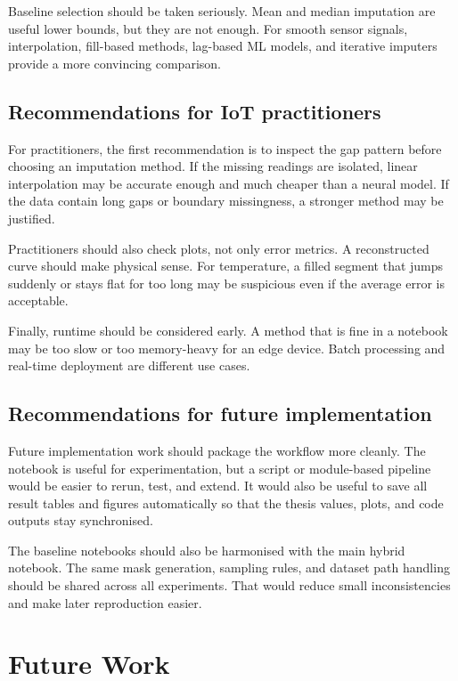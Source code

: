 Baseline selection should be taken seriously. Mean and median imputation are useful lower bounds, but they are not enough. For smooth sensor signals, interpolation, fill-based methods, lag-based ML models, and iterative imputers provide a more convincing comparison.

\subsection{Recommendations for IoT practitioners}

For practitioners, the first recommendation is to inspect the gap pattern before choosing an imputation method. If the missing readings are isolated, linear interpolation may be accurate enough and much cheaper than a neural model. If the data contain long gaps or boundary missingness, a stronger method may be justified.

Practitioners should also check plots, not only error metrics. A reconstructed curve should make physical sense. For temperature, a filled segment that jumps suddenly or stays flat for too long may be suspicious even if the average error is acceptable.

Finally, runtime should be considered early. A method that is fine in a notebook may be too slow or too memory-heavy for an edge device. Batch processing and real-time deployment are different use cases.

\subsection{Recommendations for future implementation}

Future implementation work should package the workflow more cleanly. The notebook is useful for experimentation, but a script or module-based pipeline would be easier to rerun, test, and extend. It would also be useful to save all result tables and figures automatically so that the thesis values, plots, and code outputs stay synchronised.

The baseline notebooks should also be harmonised with the main hybrid notebook. The same mask generation, sampling rules, and dataset path handling should be shared across all experiments. That would reduce small inconsistencies and make later reproduction easier.

\section{Future Work}

